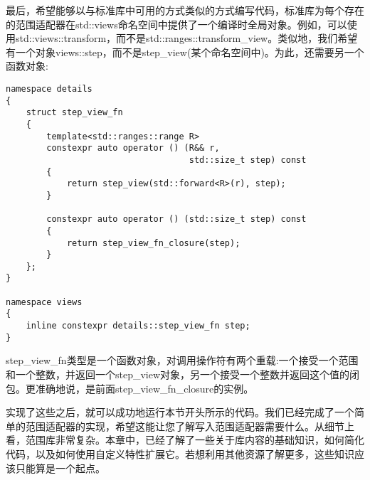 最后，希望能够以与标准库中可用的方式类似的方式编写代码，标准库为每个存在的范围适配器在std::views命名空间中提供了一个编译时全局对象。例如，可以使用std::views::transform，而不是std::ranges::transform\_view。类似地，我们希望有一个对象views::step，而不是step\_view(某个命名空间中)。为此，还需要另一个函数对象:

\begin{lstlisting}[style=styleCXX]
namespace details
{
	struct step_view_fn
	{
		template<std::ranges::range R>
		constexpr auto operator () (R&& r,
								    std::size_t step) const
		{
			return step_view(std::forward<R>(r), step);
		}
	
		constexpr auto operator () (std::size_t step) const
		{
			return step_view_fn_closure(step);
		}
	};
}

namespace views
{
	inline constexpr details::step_view_fn step;
}
\end{lstlisting}

step\_view\_fn类型是一个函数对象，对调用操作符有两个重载:一个接受一个范围和一个整数，并返回一个step\_view对象，另一个接受一个整数并返回这个值的闭包。更准确地说，是前面step\_view\_fn\_closure的实例。

实现了这些之后，就可以成功地运行本节开头所示的代码。我们已经完成了一个简单的范围适配器的实现，希望这能让您了解写入范围适配器需要什么。从细节上看，范围库非常复杂。本章中，已经了解了一些关于库内容的基础知识，如何简化代码，以及如何使用自定义特性扩展它。若想利用其他资源了解更多，这些知识应该只能算是一个起点。






























